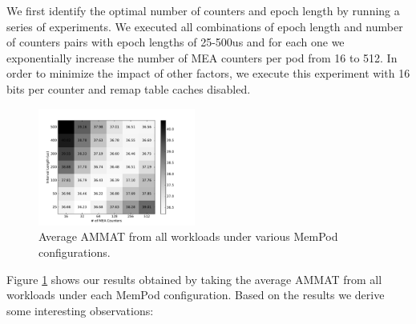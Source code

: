 We first identify the optimal number of counters and epoch length by running a series of experiments. We executed all combinations of epoch length and number of counters pairs with epoch lengths of 25-500us and for each one we exponentially increase the number of MEA counters per pod from 16 to 512. In order to minimize the impact of other factors, we execute this experiment with 16 bits per counter and remap table caches disabled. 

\begin{figure}[h]
	\centering
  \includegraphics[width=0.46\textwidth]{figures/revised/new/DSE.pdf}
  \caption{Average AMMAT from all workloads under various MemPod configurations.}
  \label{fig:dse}
\end{figure}

Figure \ref{fig:dse} shows our results obtained by taking the average AMMAT from all workloads under each MemPod configuration. Based on the results we derive some interesting observations:

